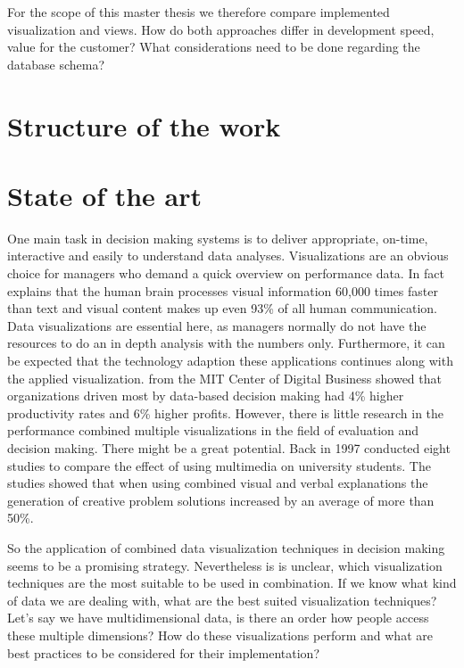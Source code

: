 \documentclass{article}
\begin{document}
For the scope of this master thesis we therefore compare implemented visualization and views.
How do both approaches differ in development speed, value for the customer?
What considerations need to be done regarding the database schema?

\section{Structure of the work}


\newpage

\section{State of the art}
One main task in decision making systems is to deliver appropriate, on-time, interactive and easily to understand data analyses.
Visualizations are an obvious choice for managers who demand a quick overview on performance data.
In fact \textcite{Kusinitz2014} explains that the human brain processes visual information 60,000 times faster than text and visual content makes up even 93\% of all human communication.
Data visualizations are essential here, as managers normally do not have the resources to do an in depth analysis with the numbers only.
Furthermore, it can be expected that the technology adaption these applications continues along with the applied visualization.
\textcite{McAfee2012} from the MIT Center of Digital Business showed that organizations driven most by data-based decision making had 4\% higher productivity rates and 6\% higher profits.
However, there is little research in the performance combined multiple visualizations in the field of evaluation and decision making.
There might be a great potential.
Back in 1997 \textcite{Mayer1997} conducted eight studies to compare the effect of using multimedia on university students.
The studies showed that when using combined visual and verbal explanations the generation of creative problem solutions increased by an average of more than 50\%.

So the application of combined data visualization techniques in decision making seems to be a promising strategy.
Nevertheless is is unclear, which visualization techniques are the most suitable to be used in combination.
If we know what kind of data we are dealing with, what are the best suited visualization techniques?
Let's say we have multidimensional data, is there an order how people access these multiple dimensions?
How do these visualizations perform and what are best practices to be considered for their implementation?
\end{document}
